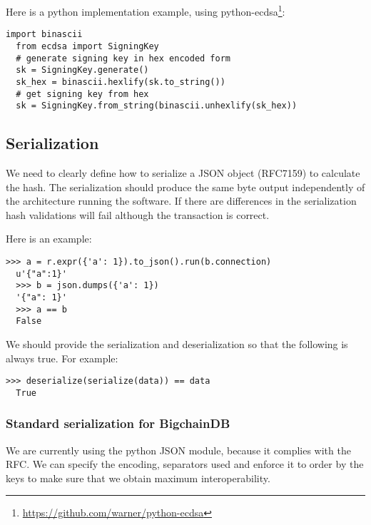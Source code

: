 \medskip
\noindent Here is a python implementation example, using \mbox{python-ecdsa}\footnote{\url{https://github.com/warner/python-ecdsa}}:

\begin{minipage}{\linewidth}
  \begin{lstlisting}[style=python]
  import binascii
  from ecdsa import SigningKey 
  # generate signing key in hex encoded form 
  sk = SigningKey.generate() 
  sk_hex = binascii.hexlify(sk.to_string()) 
  # get signing key from hex 
  sk = SigningKey.from_string(binascii.unhexlify(sk_hex))\end{lstlisting}
\end{minipage}


\subsection{Serialization}
We need to clearly define how to serialize a JSON object (RFC7159) to calculate the hash. 
The serialization should produce the same byte output independently of the architecture running the software.
If there are differences in the serialization hash validations will fail although the transaction is correct.

\medskip
\noindent Here is an example:

\begin{minipage}{\linewidth}
  \begin{lstlisting}[style=python]
  >>> a = r.expr({'a': 1}).to_json().run(b.connection)
  u'{"a":1}'
  >>> b = json.dumps({'a': 1}) 
  '{"a": 1}' 
  >>> a == b 
  False\end{lstlisting}
\end{minipage}

\medskip
\noindent We should provide the serialization and deserialization so that the following is always true.
\medskip
\noindent For example: 

\begin{minipage}{\linewidth}
  \begin{lstlisting}[style=python]
  >>> deserialize(serialize(data)) == data 
  True\end{lstlisting}
\end{minipage}


\subsubsection{Standard serialization for BigchainDB}
We are currently using the python JSON module, because it complies with the RFC.
We can specify the encoding, separators used and enforce it to order by the keys to make sure that we obtain maximum interoperability. 

